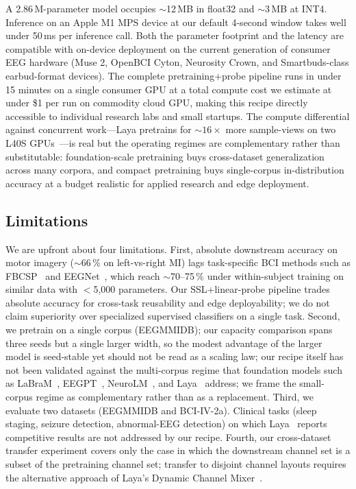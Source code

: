 A 2.86\,M-parameter model occupies $\sim$12\,MB in float32 and
$\sim$3\,MB at INT4. Inference on an Apple M1 MPS device at our default
4-second window takes well under 50\,ms per inference call. Both the
parameter footprint and the latency are compatible with on-device
deployment on the current generation of consumer EEG hardware (Muse 2,
OpenBCI Cyton, Neurosity Crown, and Smartbuds-class earbud-format
devices). The complete pretraining$+$probe pipeline runs in under 15
minutes on a single consumer GPU at a total compute cost we estimate at
under \$1 per run on commodity cloud GPU, making this recipe directly
accessible to individual research labs and small startups. The
compute differential against concurrent work---Laya pretrains for
$\sim$$16\times$ more sample-views on two L40S GPUs~\cite{laya2026}---is
real but the operating regimes are complementary rather than
substitutable: foundation-scale pretraining buys cross-dataset
generalization across many corpora, and compact pretraining buys
single-corpus in-distribution accuracy at a budget realistic for
applied research and edge deployment.

\subsection{Limitations}

We are upfront about four limitations. First, absolute downstream
accuracy on motor imagery ($\sim$66\,\% on left-vs-right MI)
lags task-specific BCI methods such as FBCSP~\cite{fbcsp2008} and
EEGNet~\cite{eegnet2018}, which reach $\sim$70--75\,\% under
within-subject training on similar data with $<$5{,}000 parameters. Our
SSL$+$linear-probe pipeline trades absolute accuracy for cross-task
reusability and edge deployability; we do not claim superiority over
specialized supervised classifiers on a single task. Second, we pretrain
on a single corpus (EEGMMIDB); our capacity comparison spans three seeds
but a single larger width, so the modest advantage of the larger model is
seed-stable yet should not be read as a scaling law; our recipe
itself has not been validated against the multi-corpus regime that
foundation models such as LaBraM~\cite{labram2024},
EEGPT~\cite{eegpt2024}, NeuroLM~\cite{neurolm2025}, and
Laya~\cite{laya2026} address; we frame the small-corpus regime as
complementary rather than as a replacement. Third, we evaluate two
datasets (EEGMMIDB and BCI-IV-2a). Clinical tasks (sleep staging,
seizure detection, abnormal-EEG detection) on which Laya~\cite{laya2026}
reports competitive results are not addressed by our recipe. Fourth, our
cross-dataset transfer experiment covers only the case in which the
downstream channel set is a subset of the pretraining channel set;
transfer to disjoint channel layouts requires the alternative approach
of Laya's Dynamic Channel Mixer~\cite[Sec.~3.3]{laya2026}.

